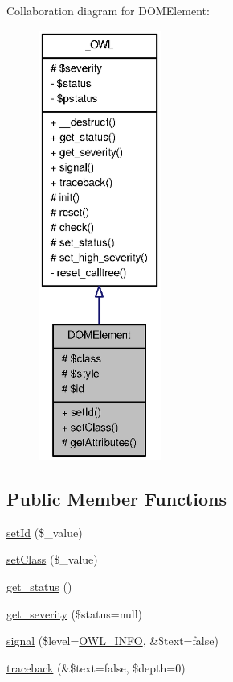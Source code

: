 Collaboration diagram for DOMElement:\nopagebreak
\begin{figure}[H]
\begin{center}
\leavevmode
\includegraphics[height=400pt]{classDOMElement__coll__graph}
\end{center}
\end{figure}
\subsection*{Public Member Functions}
\begin{DoxyCompactItemize}
\item 
\hyperlink{classDOMElement_afb849b6d94ad4911d255e7ede4ee0d83}{setId} (\$\_\-value)
\item 
\hyperlink{classDOMElement_a593e89f31f6c1050d3948b29b00f387a}{setClass} (\$\_\-value)
\item 
\hyperlink{class__OWL_a99ec771fa2c5c279f80152cc09e489a8}{get\_\-status} ()
\item 
\hyperlink{class__OWL_adf9509ef96858be7bdd9414c5ef129aa}{get\_\-severity} (\$status=null)
\item 
\hyperlink{class__OWL_a51ba4a16409acf2a2f61f286939091a5}{signal} (\$level=\hyperlink{owl_8severitycodes_8php_a139328861128689f2f4def6a399d9057}{OWL\_\-INFO}, \&\$text=false)
\item 
\hyperlink{class__OWL_aa29547995d6741b7d2b90c1d4ea99a13}{traceback} (\&\$text=false, \$depth=0)
\end{DoxyCompactItemize}
